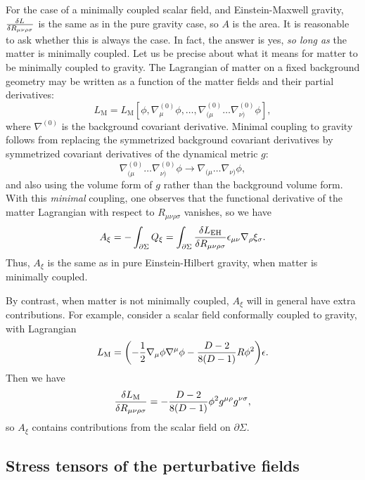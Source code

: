 \documentclass[]{jkpaper}
\theoremstyle{plain}
\theoremstyle{definition}
\begin{document}
For the case of a minimally coupled scalar field, and Einstein-Maxwell gravity, $\fdv{L}{R_{\mu\nu\rho\sigma}}$ is the same as in the pure gravity case, so $A$ is the area. It is reasonable to ask whether this is always the case. In fact, the answer is yes, \emph{so long as} the matter is minimally coupled. Let us be precise about what it means for matter to be minimally coupled to gravity. The Lagrangian of matter on a fixed background geometry may be written as a function of the matter fields and their partial derivatives:
\begin{equation}
    L_{\text{M}} = L_{\text{M}}[\phi,\nabla^{(0)}_\mu\phi,\dots,\nabla^{(0)}_{(\mu}\dots\nabla^{(0)}_{\nu)}\phi],
\end{equation}
where $\nabla^{(0)}$ is the background covariant derivative. Minimal coupling to gravity follows from replacing the symmetrized background covariant derivatives by symmetrized covariant derivatives of the dynamical metric $g$:
\begin{equation}
    \nabla^{(0)}_{(\mu}\dots\nabla^{(0)}_{\nu)}\phi \to \nabla_{(\mu}\dots\nabla_{\nu)}\phi,
\end{equation}
and also using the volume form of $g$ rather than the background volume form. With this \emph{minimal} coupling, one observes that the functional derivative of the matter Lagrangian with respect to $R_{\mu\nu\rho\sigma}$ vanishes, so we have
\begin{equation}
    A_\xi = -\int_{\partial\Sigma} Q_\xi = \int_{\partial\Sigma}\fdv{L_\text{EH}}{R_{\mu\nu\rho\sigma}}\epsilon_{\mu\nu}\nabla_\rho\xi_\sigma.
\end{equation}
Thus, $A_\xi$ is the same as in pure Einstein-Hilbert gravity, when matter is minimally coupled.

By contrast, when matter is not minimally coupled, $A_\xi$ will in general have extra contributions. For example, consider a scalar field conformally coupled to gravity, with Lagrangian
\begin{equation}
    L_{\text{M}} = \qty(-\frac12\nabla_\mu\phi\nabla^\mu\phi-\frac{D-2}{8(D-1)} R\phi^2)\epsilon.
\end{equation}
Then we have
\begin{equation}
    \fdv{L_\text{M}}{R_{\mu\nu\rho\sigma}} = - \frac{D-2}{8(D-1)}\phi^2 g^{\mu\rho} g^{\nu\sigma},
\end{equation}
so $A_\xi$ contains contributions from the scalar field on $\partial\Sigma$. 

\subsection{Stress tensors of the perturbative fields}
\end{document}
